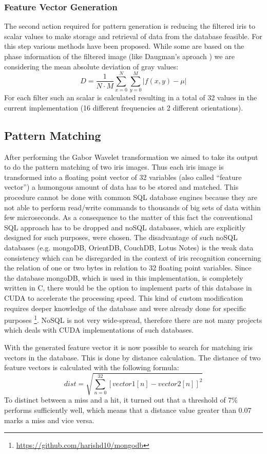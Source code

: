 \documentclass[journal]{IEEEtran}
\begin{document}
\subsubsection{Feature Vector Generation}
The second action required for pattern generation is reducing the filtered iris to scalar values to make storage and retrieval of data from the database feasible. For this step various methods have been proposed. While some are based on the phase information of the filtered image (like Daugman's aproach  \cite{daugman2004iris}) we are considering the mean absolute deviation of gray values:
\[
D = \frac{1}{N\cdot M} \sum \limits_{x=0}^N \sum \limits_{y=0}^M |f(x,y) - \mu|
\]
For each filter such an scalar is calculated resulting in a total of 32 values in the current implementation (16 different frequencies at 2 different orientations).
\subsection{Pattern Matching}

After performing the Gabor Wavelet transformation we aimed to take its output to do the pattern matching of two iris images. Thus each iris image is transformed into a floating point vector of 32 variables (also called “feature vector”) a humongous amount of data has to be stored and matched. This procedure cannot be done with common SQL database engines because they are not able to perform read/write commands to thousands of big sets of data within few  microseconds. As a consequence to the matter of this fact the conventional SQL approach has to be dropped and noSQL databases, which are explicitly designed for such purposes, were chosen. The disadvantage of such noSQL databases (e.g. mongoDB, OrientDB, CouchDB, Lotus Notes) is the weak data consistency which can be disregarded in the context of iris recognition concerning the relation of one or two bytes in relation to 32 floating point variables. Since the database mongoDB, which is used in this implementation, is completely written in C, there would be the option to implement parts of this database in CUDA to accelerate the processing speed. This kind of custom modification requires deeper knowledge of the database and were already done for specific purposes \footnote{\url{https://github.com/harishd10/mongodb}}. NoSQL is not very wide-spread, therefore there are not many projects which deals with CUDA implementations of such databases.
\par With the generated feature vector it is now possible to search for matching iris vectors in the database. This is done by distance calculation. The distance of two feature vectors is calculated with the following formula:
\[
dist = \sqrt{\sum_{n=0}^{32}{[vector1[n]-vector2[n]]}^2}
\]
To distinct between a miss and a hit, it turned out that a threshold of 7\% performs sufficiently well, which means that a distance value greater than 0.07 marks a miss and vice versa.
\end{document}

